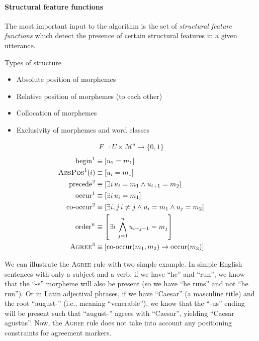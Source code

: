 \paragraph{Structural feature functions}

The most important input to the algorithm is the set of \emph{structural feature functions} which detect the presence of certain structural features in a given utterance.

Types of structure
\begin{itemize}[nosep]
  \item Absolute position of morphemes
  \item Relative position of morphemes (to each other)
  \item Collocation of morphemes
  \item Exclusivity of morphemes and word classes
\end{itemize}
\begin{align}
  F &: U \times \mathcal M^a \rightarrow \{0,1\}
\end{align}
\begin{align}
  \text{begin}^1 &\equiv [u_1 = m_1] \\
  \textsc{AbsPos}^1(i) &\equiv [u_i = m_1] \\
  \text{precede}^2 &\equiv [\exists i \, u_i = m_1 \wedge u_{i+1} = m_2] \\
  \text{occur}^1 &\equiv [\exists i \,u_i = m_1] \\
  \text{co-occur}^2 &\equiv [\exists i,j \, i \neq j \wedge u_i = m_1 \wedge u_j = m_2] \\
  \text{order}^n &\equiv \left[\exists i \, \bigwedge_{j=1}^n u_{i+j-1} = m_{j} \right] \\
  \textsc{Agree}^3 &\equiv [\text{co-occur}(m_1, m_2) \rightarrow \text{occur}(m_3)] \\
\end{align}

We can illustrate the \textsc{Agree} rule with two simple example.
In simple English sentences with only a subject and a verb, if we have ``he'' and ``run'', we know that the ``-s'' morpheme will also be present (so we have ``he runs'' and not ``he run'').
Or in Latin adjectival phrases, if we have ``Caesar'' (a masculine title) and the root ``august-'' (i.e., meaning ``venerable''), we know that the ``-us'' ending will be present such that ``august-'' agrees with ``Caesar'', yielding ``Caesar agustus''.
Now, the \textsc{Agree} rule does not take into account any positioning constraints for agreement markers.

